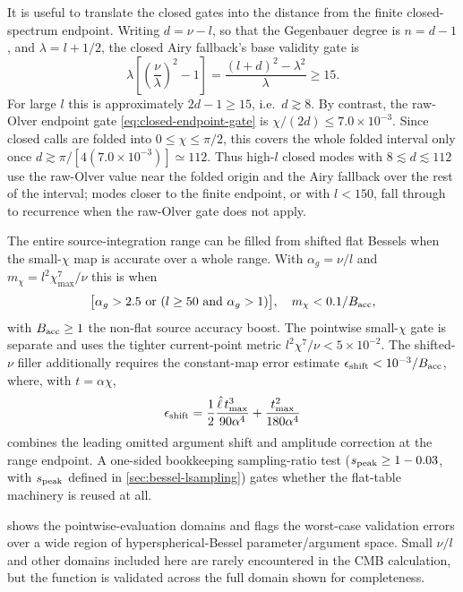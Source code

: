 \documentclass[prd, twocolumn, superscriptaddress, tightenlines, longbibliography, nofootinbib, eqsecnum, amsfonts, amsmath, floatfix, notitlepage]{revtex4-2}
\newcommand{\peakscale}{s_{\rm peak}}
\newcommand{\code}[1]{\texttt{\detokenize{#1}}}
\begin{document}
It is useful to translate the closed gates into the distance from the finite
closed-spectrum endpoint. Writing \(d=\nu-l\), so that the Gegenbauer degree is
\(n=d-1\), and \(\lambda=l+1/2\), the closed Airy fallback's base validity gate is
\begin{equation}
  \lambda\left[\left(\frac{\nu}{\lambda}\right)^2-1\right]
  =\frac{(l+d)^2-\lambda^2}{\lambda}\ge15 .
\end{equation}
For large \(l\) this is approximately \(2d-1\ge15\), i.e.\ \(d\gtrsim8\). By
contrast, the raw-Olver endpoint gate \cref{eq:closed-endpoint-gate} is
\(\chi/(2d)\le7.0\times10^{-3}\).
Since closed calls are folded into \(0\le\chi\le\pi/2\), this covers the whole
folded interval only once
\(d\gtrsim\pi/[4(7.0\times10^{-3})]\simeq112\). Thus high-\(l\) closed modes
with \(8\lesssim d\lesssim112\) use the raw-Olver value near the folded origin
and the Airy fallback over the rest of the interval; modes closer to the finite
endpoint, or with \(l<150\), fall through to recurrence when the raw-Olver gate
does not apply.

The entire source-integration range can be filled from shifted flat Bessels when the small-$\chi$ map is accurate over a whole range. With $\alpha_g=\nu/l$ and
$m_\chi=l^2\chi_{\max}^7/\nu$ this is when
\begin{equation}
  \bigl[\alpha_g>2.5\ {\rm or}\ (l\ge50\ {\rm and}\ \alpha_g>1)\bigr],
  \quad
  m_\chi<0.1/B_{\rm acc},
\end{equation}
with $B_{\rm acc}\ge1$ the non-flat source accuracy boost. The pointwise
\code{phi_olver} small-$\chi$ gate is separate and uses the tighter current-point
metric $l^2\chi^7/\nu<5\times10^{-2}$. The shifted-$\nu$ filler additionally
requires the constant-map error estimate
$\epsilon_{\rm shift}<10^{-3}/B_{\rm acc}$, where, with $t=\alpha\chi$,
\begin{equation}
  \epsilon_{\rm shift}=\frac12\frac{\hat\ell\,t_{\max}^3}{90\alpha^4}+\frac{t_{\max}^2}{180\alpha^4}
  \label{eq:shift-error}
\end{equation}
combines the leading omitted argument shift and amplitude correction at the range
endpoint. A one-sided bookkeeping sampling-ratio test
(\(\peakscale\ge1-0.03\), with \(\peakscale\) defined in
\cref{sec:bessel-lsampling}) gates whether the flat-table machinery is reused at
all.

 shows the pointwise-evaluation domains and flags the worst-case validation errors over a
wide region of hyperspherical-Bessel parameter/argument space. Small $\nu/l$ and other domains included here are rarely encountered in the CMB calculation, but the \code{phi_olver} function is validated across the full domain shown for completeness.
\end{document}
